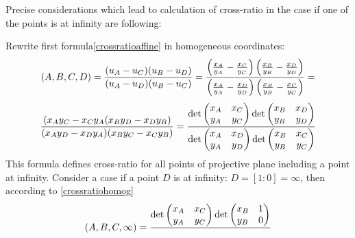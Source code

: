 \documentclass[12pt]{article}
\numberwithin{equation}{section}
\begin{document}
{\footnotesize Precise considerations
which lead to calculation of cross-ratio in the case 
if one of the points
is at infinity are following:
 
  Rewrite first  formula\eqref{crossratioaffine} 
in homogeneous coordinates:
                  $$
(A,B,C,D)=
{(u_A-u_C)(u_B-u_D)\over (u_A-u_D)(u_B-u_C)}=
                           {
\left({x_A\over y_A}-{x_C\over y_C}\right)
\left({x_B\over y_B}-{x_D\over y_D}\right)
           \over 
\left({x_A\over y_A}-{x_D\over y_D}\right)
\left({x_B\over y_B}-{x_C\over y_C}\right)
                }=
                  $$
                 \begin{equation}\label{crossratiohomog}
                    {
    (x_Ay_C-x_Cy_A(x_By_D-x_Dy_B)
                  \over
    (x_Ay_D-x_Dy_A)(x_By_C-x_Cy_B)
                  }
               =
             {
               \det
            \begin{pmatrix}
                     x_A & x_C\cr
                     y_A & y_C\cr
            \end{pmatrix}
                 \det
            \begin{pmatrix}
                     x_B & x_D\cr
                     y_B & y_D\cr
            \end{pmatrix}
                     \over
               \det
            \begin{pmatrix}
                     x_A & x_D\cr
                     y_A & y_D\cr
            \end{pmatrix}
                 \det
            \begin{pmatrix}
                     x_B & x_C\cr
                     y_B & y_C\cr
            \end{pmatrix}
              }
                 \end{equation}
This formula defines  cross-ratio for all points of projective plane
including a point at infinity.
Consider a case if 
a point $D$ is at infinity: $D=[1:0]=\infty$, then 
    according to \eqref{crossratiohomog}   
                    $$
(A,B,C,\infty)=             {
               \det
            \begin{pmatrix}
                     x_A & x_C\cr
                     y_A & y_C\cr
            \end{pmatrix}
                 \det
            \begin{pmatrix}
                     x_B & 1\cr
                     y_B & 0\cr
            \end{pmatrix}
                     \over
}$$}
\end{document}
